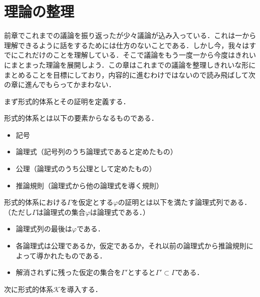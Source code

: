 \documentclass[10pt,b5paper,papersize,dvipdfmx]{jsbook}
\newenvironment{TEIRI}[1]{
  \itemize
  \item [\headfont #1]
}{\enditemize}
\begin{document}
\section{理論の整理}
前章でこれまでの議論を振り返ったが少々議論が込み入っている．これは一から理解できるように話をするためには仕方のないことである．しかし今，我々はすでにこれだけのことを理解している．そこで議論をもう一度一から今度はきれいにまとまった理論を展開しよう．この章はこれまでの議論を整理しきれいな形にまとめることを目標にしており，内容的に進むわけではないので読み飛ばして次の章に進んでもらってかまわない．\par
まず形式的体系とその証明を定義する．
\begin{TEIRI}{定義}
  形式的体系とは以下の要素からなるものである．
  \begin{itemize}
    \item 記号
    \item 論理式（記号列のうち論理式であると定めたもの）
    \item 公理（論理式のうち公理として定めたもの）
    \item 推論規則（論理式から他の論理式を導く規則）
  \end{itemize}
\end{TEIRI}
\begin{TEIRI}{定義}
  形式的体系における$\Gamma$を仮定とする$\varphi$の証明とは以下を満たす論理式列である．（ただし$\Gamma$は論理式の集合$\varphi$は論理式である．）
  \begin{itemize}
    \item 論理式列の最後は$\varphi$である．
    \item 各論理式は公理であるか，仮定であるか，それ以前の論理式から推論規則によって導かれたものである．
    \item 解消されずに残った仮定の集合を$\Gamma'$とすると$\Gamma'\subset \Gamma$である．
  \end{itemize}
\end{TEIRI}
    次に形式的体系$\mathcal K$を導入する．
\end{document}
